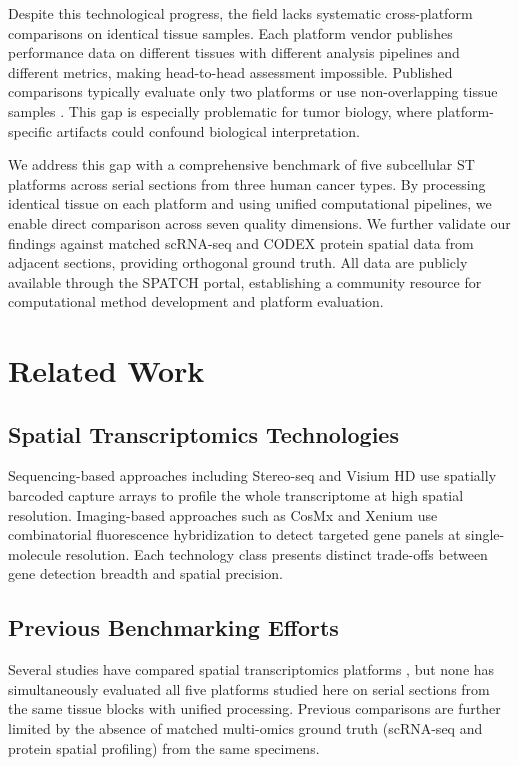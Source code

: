\documentclass[11pt]{article}
\begin{document}
Despite this technological progress, the field lacks systematic cross-platform comparisons on identical tissue samples. Each platform vendor publishes performance data on different tissues with different analysis pipelines and different metrics, making head-to-head assessment impossible. Published comparisons typically evaluate only two platforms or use non-overlapping tissue samples \citep{hartman2024benchmarking}. This gap is especially problematic for tumor biology, where platform-specific artifacts could confound biological interpretation.

We address this gap with a comprehensive benchmark of five subcellular ST platforms across serial sections from three human cancer types. By processing identical tissue on each platform and using unified computational pipelines, we enable direct comparison across seven quality dimensions. We further validate our findings against matched scRNA-seq and CODEX protein spatial data from adjacent sections, providing orthogonal ground truth. All data are publicly available through the SPATCH portal, establishing a community resource for computational method development and platform evaluation.

\section{Related Work}

\subsection{Spatial Transcriptomics Technologies}
Sequencing-based approaches including Stereo-seq \citep{chen2022spatiotemporal} and Visium HD \citep{kleshchevnikov2022cell} use spatially barcoded capture arrays to profile the whole transcriptome at high spatial resolution. Imaging-based approaches such as CosMx \citep{he2022cosmx} and Xenium \citep{janesick2023xenium} use combinatorial fluorescence hybridization to detect targeted gene panels at single-molecule resolution. Each technology class presents distinct trade-offs between gene detection breadth and spatial precision.

\subsection{Previous Benchmarking Efforts}
Several studies have compared spatial transcriptomics platforms \citep{hartman2024benchmarking, williams2022introduction}, but none has simultaneously evaluated all five platforms studied here on serial sections from the same tissue blocks with unified processing. Previous comparisons are further limited by the absence of matched multi-omics ground truth (scRNA-seq and protein spatial profiling) from the same specimens.
\end{document}
